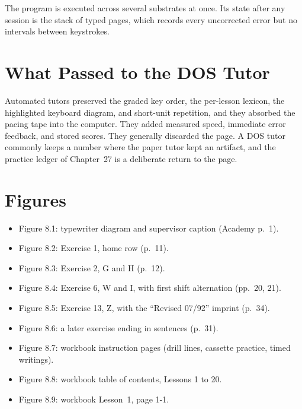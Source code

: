 The program is executed across several substrates at once. Its state after any session is the stack of typed pages, which records every uncorrected error but no intervals between keystrokes.

\section{What Passed to the DOS Tutor}

Automated tutors preserved the graded key order, the per-lesson lexicon, the highlighted keyboard diagram, and short-unit repetition, and they absorbed the pacing tape into the computer. They added measured speed, immediate error feedback, and stored scores. They generally discarded the page. A DOS tutor commonly keeps a number where the paper tutor kept an artifact, and the practice ledger of Chapter~27 is a deliberate return to the page.

\section*{Figures}
\begin{itemize}
\item Figure 8.1: typewriter diagram and supervisor caption (Academy p.~1).
\item Figure 8.2: Exercise 1, home row (p.~11).
\item Figure 8.3: Exercise 2, G and H (p.~12).
\item Figure 8.4: Exercise 6, W and I, with first shift alternation (pp.~20, 21).
\item Figure 8.5: Exercise 13, Z, with the ``Revised 07/92'' imprint (p.~34).
\item Figure 8.6: a later exercise ending in sentences (p.~31).
\item Figure 8.7: workbook instruction pages (drill lines, cassette practice, timed writings).
\item Figure 8.8: workbook table of contents, Lessons 1 to 20.
\item Figure 8.9: workbook Lesson~1, page 1-1.
\end{itemize}

